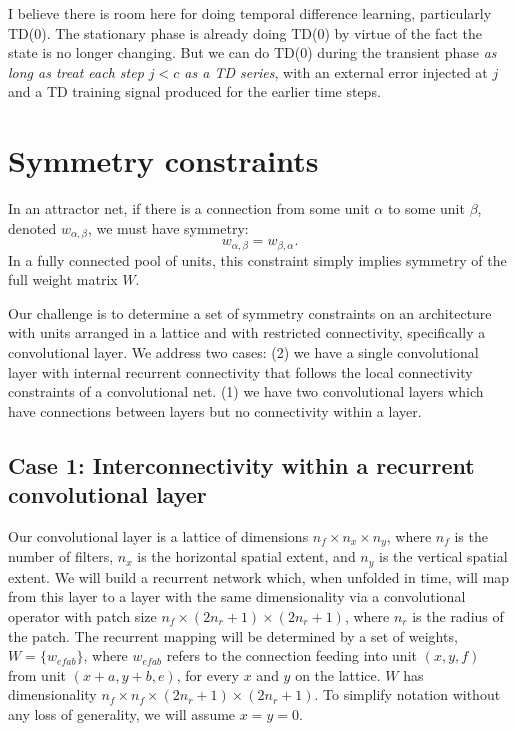 \documentclass[11pt,letterpaper]{article}
\theoremstyle{definition}
\begin{document}
I believe there is room here for doing temporal difference learning, particularly TD(0). The stationary phase is already doing TD(0) by virtue of the fact the state is no longer changing. But we can do TD(0) during the transient phase \textit{as long as treat each step $ j < c$ as a TD series}, with an external error injected at $j$ and a TD training signal produced for the earlier time steps.
\section{Symmetry constraints} \label{section:symmetry}


In an attractor net, if there is a connection from some unit $\alpha$ to
some unit $\beta$, denoted $w_{\alpha,\beta}$, we must have symmetry:
\[
w_{\alpha,\beta} = w_{\beta,\alpha} .
\]
In a fully connected pool of units, this constraint simply implies symmetry
of the full weight matrix $W$.

Our challenge is to determine a set of symmetry constraints on an architecture 
with units arranged in a lattice and with restricted connectivity, specifically
a convolutional layer. We address  two cases: 
(2) we have a single convolutional layer with internal recurrent connectivity
that follows the local connectivity constraints of a convolutional net.
(1) we have two convolutional 
layers which have connections between layers but no connectivity within a layer.

\subsection{Case 1: Interconnectivity within a recurrent convolutional layer}

Our convolutional layer is a lattice of dimensions
$n_f \times n_x \times n_y$, where 
$n_f$ is the number of filters,
$n_x$ is the horizontal spatial extent,  and
$n_y$ is the vertical spatial extent.
We will build a recurrent network which, when unfolded in time, will map from
this layer to a layer with the
same dimensionality via a convolutional operator with patch size
$n_f \times (2n_r+1) \times (2n_r+1)$, where $n_r$ is the radius of the patch.
The recurrent mapping will be determined by a set of weights, 
$W = \{ w_{efab} \}$, where $w_{efab}$ refers to the connection feeding into
unit $(x,y,f)$ from unit $(x+a,y+b,e)$, for every $x$ and $y$ on the lattice.
$W$ has dimensionality $n_f \times n_f \times (2n_r+1) \times (2n_r+1)$.
To simplify notation without any loss of generality, we will assume $x=y=0$.
\end{document}
